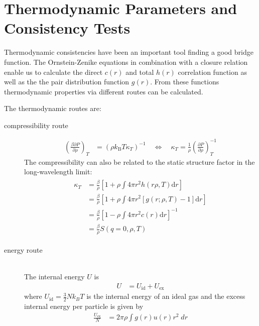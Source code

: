 \section{Thermodynamic Parameters and Consistency Tests}

Thermodynamic consistencies have been an important tool finding a good bridge function.
The Ornstein-Zenike equations in combination with a closure relation enable us to calculate
the direct $c(r)$ and total $h(r)$ correlation function  as well as the the pair distribution function $g(r)$.
From these functions thermodynamic properties via different routes can be calculated.

The thermodynamic routes are:
\begin{description}
\item[compressibility route]
\begin{align} \label{eq:compressibility}
\left(\frac{\beta \partial P}{\partial\rho}\right)_T &= \left(\rho
k_\mathrm{B} T \kappa_T\right)^{-1} \quad \Leftrightarrow \quad
\kappa_T = \frac{1}{\rho} \left(\frac{\partial
P}{\partial\rho}\right)^{-1}_T
\end{align}
The compressibility can also be related to the static structure factor in the long-wavelength limit:
\begin{align} \label{eq:compressibilitySQ}
\begin{split}
\kappa_T &= \frac{\beta}{\rho} \left[1+\rho \displaystyle \int 4\pi r^2 h(r\rho,T) \mathrm{d}r\right] \\
         &= \frac{\beta}{\rho} \left[1+\rho \displaystyle \int 4\pi r^2 \left[g(r;\rho,T)-1\right] \mathrm{d}r\right] \\
         &= \frac{\beta}{\rho} \left[ 1-\rho\int 4\pi r^2 c(r) \mathrm{d}r\right]^{-1} \\
         &= \frac{\beta}{\rho} S(q=0,\rho,T)
\end{split}
\end{align}
\item[energy route] ~\vphantom{.} \\
The internal energy $U$ is
\begin{align}
U &= U_\text{id} + U_\text{ex}
\end{align}
where $U_\text{id}=\frac{3}{2} N k_B T$ is the internal energy of an ideal gas and
the excess internal energy per particle is given by
\begin{align} \label{eq:internal_energy}
\frac{U_\text{ex}}{N} &= 2\pi\rho \int g(r) u(r) r^2 \;dr
\end{align}

\end{description}
